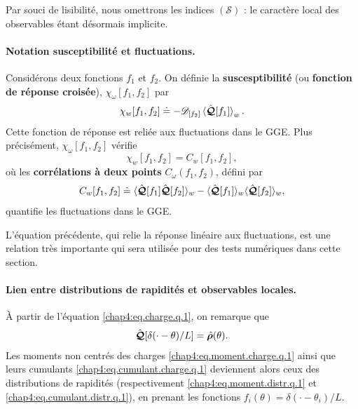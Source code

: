 \medskip

Par souci de lisibilité, nous omettrons les indices \((\mathcal{S})\) : le caractère local des observables étant désormais implicite.

\medskip

\paragraph{Notation susceptibilité et fluctuations.}

Considérons deux fonctions $f_1$ et $f_2$. On définie la {\bf suscesptibilité} (ou {\bf fonction de réponse croisée}), $\chi_\omega[f_1, f_2]$  par
\begin{equation}\label{chap4:eq.susceptibilite-fonctionnelle_2}
	\chi_w[f_1, f_2] \doteq - \mathscr{D}_{[f_2]}  \braket{\hat{\bm{\mathcal{Q}}}[f_1]}_w.
\end{equation}
Cette fonction de réponse est reliée aux fluctuations dans le GGE. Plus précisément, $\chi_\omega[f_1, f_2]$ vérifie
\begin{equation}\label{chap4:eq.suscep.corre.1}
	\chi_w[f_1, f_2] = C_w[f_1, f_2],
\end{equation}
où les {\bf corrélations à deux points} $C_\omega(f_1, f_2)$, défini par
\begin{equation}\label{chap4:eq.corre.1}
C_w[f_1, f_2] \doteq \langle \hat{\bm{\mathcal{Q}}}[f_1] \hat{\bm{\mathcal{Q}}}[f_2] \rangle_w - \langle \hat{\bm{\mathcal{Q}}}[f_1] \rangle_w \langle \hat{\bm{\mathcal{Q}}}[f_2] \rangle_w,
\end{equation}
quantifie les fluctuations dans le GGE.

L'équation précédente, qui relie la réponse linéaire aux fluctuations, est une relation très importante qui sera utilisée pour des tests numériques dans cette section.

\paragraph{Lien entre distributions de rapidités et observables locales.}

À partir de l’équation \eqref{chap4:eq.charge.q.1}, on remarque que 
\begin{eqnarray}
	\hat{\bm{\mathcal{Q}}}[\delta(\cdot - \theta)/L] = \hat{\bm{\rho}}(\theta).
\end{eqnarray}
Les moments non centrés des charges \eqref{chap4:eq.moment.charge.q.1} ainsi que leurs cumulants \eqref{chap4:eq.cumulant.charge.q.1} deviennent alors ceux des distributions de rapidités (respectivement \eqref{chap4:eq.moment.distr.q.1} et \eqref{chap4:eq.cumulant.distr.q.1}), en prenant les fonctions $f_i(\theta) = \delta(\cdot - \theta_i)/L$.\\

